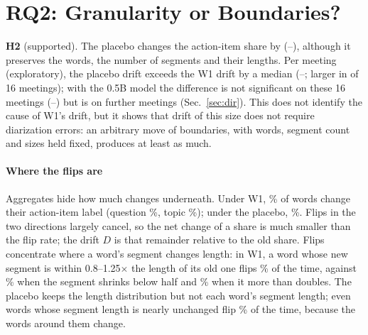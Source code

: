 \documentclass[conference]{IEEEtran}
\begin{document}
\section{RQ2: Granularity or Boundaries?}\label{sec:rq2}
\textbf{H2} (supported). The placebo changes the action-item share by \nHtwomed{} (\nHtwolo--\nHtwohi), although it
preserves the words, the number of segments and their lengths. Per meeting (exploratory), the placebo drift exceeds the W1 drift
by a median \nPlaceboGapmed{} (\nPlaceboGaplo--\nPlaceboGaphi; larger in \nPlaceboGaplarger{} of 16 meetings); with
the 0.5B model the difference is not significant on these 16 meetings (\nPlaceboGapMtwolo--\nPlaceboGapMtwohi) but is
on \nScaleN{} further meetings (Sec.~\ref{sec:dir}). This does not identify the
cause of W1's drift, but it shows that drift of this size does not require diarization errors: an arbitrary move of
boundaries, with words, segment count and sizes held fixed, produces at least as much.
\paragraph*{Where the flips are} Aggregates hide how much changes underneath. Under W1, \nFlipWoneactionitem\% of words
change their action-item label (question \nFlipWonequestion\%, topic \nFlipWonetopic\%); under the placebo,
\nFlipWtwoactionitem\%. Flips in the two directions largely cancel, so the
net change of a share is much smaller than the flip rate; the drift $D$ is that remainder relative to the old share. Flips concentrate where a word's segment changes length: in
W1, a word whose new segment is within 0.8--1.25$\times$ the length of its old one flips \nFlipWonesame\% of the time,
against \nFlipWonehalf\% when the segment shrinks below half and \nFlipWonedouble\% when it more than doubles. The
placebo keeps the length distribution but not each word's segment length; even words whose segment length is nearly
unchanged flip \nFlipWtwosame\% of the time, because the words around them change.
\end{document}
